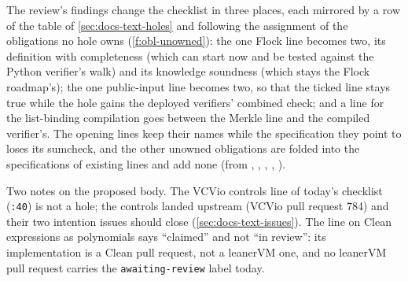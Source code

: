 \begin{sloppypar}
The review's findings change the checklist in three places, each mirrored by a row of the table of \cref{sec:docs-text-holes} and following the assignment of the obligations no hole owns (\cref{f:obl-unowned}): the one Flock line becomes two, its definition with completeness (which can start now and be tested against the Python verifier's walk) and its knowledge soundness (which stays the Flock roadmap's); the one public-input line becomes two, so that the ticked line stays true while the hole gains the deployed verifiers' combined check; and a line for the list-binding compilation goes between the Merkle line and the compiled verifier's. The opening lines keep their names while the specification they point to loses its sumcheck, and the other unowned obligations are folded into the specifications of existing lines and add none (from , , , , ).
\end{sloppypar}


\begin{sloppypar}
Two notes on the proposed body. The VCVio controls line of today's checklist (\texttt{:\allowbreak{}40}) is not a hole; the controls landed upstream (VCVio pull request 784) and their two intention issues should close (\cref{sec:docs-text-issues}). The line on Clean expressions as polynomials says ``claimed'' and not ``in review'': its implementation is a Clean pull request, not a leanerVM one, and no leanerVM pull request carries the \texttt{awaiting-\allowbreak{}review} label today.
\end{sloppypar}

